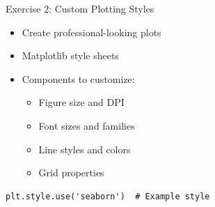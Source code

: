 \documentclass{beamer}
\begin{document}
\begin{frame}[fragile]{Exercise 2: Custom Plotting Styles}
    \begin{itemize}
        \item Create professional-looking plots
        \item Matplotlib style sheets
        \item Components to customize:
        \begin{itemize}
            \item Figure size and DPI
            \item Font sizes and families
            \item Line styles and colors
            \item Grid properties
        \end{itemize}
    \end{itemize}
    \vspace{1em}
    \begin{lstlisting}
plt.style.use('seaborn')  # Example style
    \end{lstlisting}
\end{frame}
\end{document}
